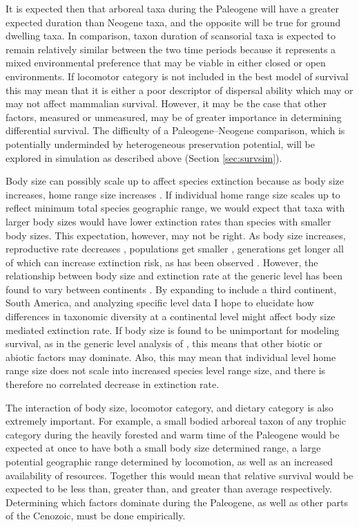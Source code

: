 \documentclass[12pt,letterpaper]{article}
\begin{document}
It is expected then that arboreal taxa during the Paleogene will have a greater expected duration than Neogene taxa, and the opposite will be true for ground dwelling taxa. In comparison, taxon duration of scansorial taxa is expected to remain relatively similar between the two time periods because it represents a mixed environmental preference that may be viable in either closed or open environments. If locomotor category is not included in the best model of survival this may mean that it is either a poor descriptor of dispersal ability which may or may not affect mammalian survival. However, it may be the case that other factors, measured or unmeasured, may be of greater importance in determining differential survival. The difficulty of a Paleogene--Neogene comparison, which is potentially underminded by heterogeneous preservation potential, will be explored in simulation as described above (Section \ref{sec:survsim}).

Body size can possibly scale up to affect species extinction because as body size increases, home range size increases \citep{Damuth1979}. If individual home range size scales up to reflect minimum total species geographic range, we would expect that taxa with larger body sizes would have lower extinction rates than species with smaller body sizes. This expectation, however, may not be right. As body size increases, reproductive rate decreases \citep{Johnson2002b}, populations get smaller \citep{White2007}, generations get longer \citep{Martin1993a} all of which can increase extinction risk, as has been observed \citep{Liow2008,Davidson2012}. However, the relationship between body size and extinction rate at the generic level has been found to vary between continents \citep{Tomiya2013,Liow2008}. By expanding to include a third continent, South America, and analyzing specific level data I hope to elucidate how differences in taxonomic diversity at a continental level might affect body size mediated extinction rate. If body size is found to be unimportant for modeling survival, as in the generic level analysis of \citet{Tomiya2013}, this means that other biotic or abiotic factors may dominate. Also, this may mean that individual level home range size does not scale into increased species level range size, and there is therefore no correlated decrease in extinction rate. 

The interaction of body size, locomotor category, and dietary category is also extremely important. For example, a small bodied arboreal taxon of any trophic category during the heavily forested and warm time of the Paleogene would be expected at once to have both a small body size determined range, a large potential geographic range determined by locomotion, as well as an increased availability of resources. Together this would mean that relative survival would be expected to be less than, greater than, and greater than average respectively. Determining which factors dominate during the Paleogene, as well as other parts of the Cenozoic, must be done empirically.
\end{document}
